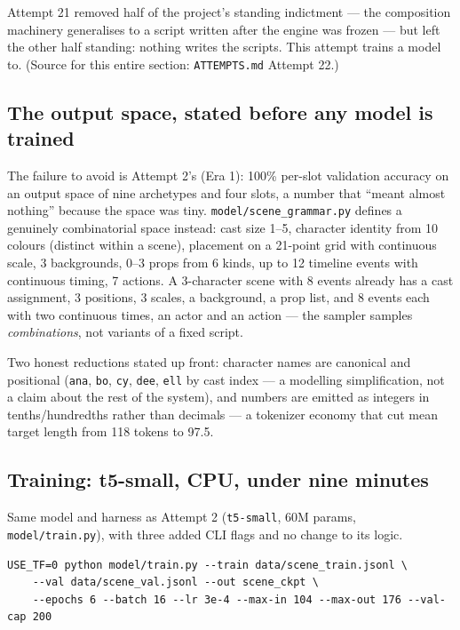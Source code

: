 \documentclass[11pt]{article}
\begin{document}
Attempt 21 removed half of the project's standing indictment --- the
composition machinery generalises to a script written after the engine
was frozen --- but left the other half standing: nothing writes the
scripts. This attempt trains a model to. (Source for this entire section:
\texttt{ATTEMPTS.md} Attempt 22.)

\subsection{The output space, stated before any model is trained}
\label{sec:outputspace}

The failure to avoid is Attempt 2's (Era 1): 100\% per-slot validation
accuracy on an output space of nine archetypes and four slots, a number
that ``meant almost nothing'' because the space was tiny.
\texttt{model/scene\_grammar.py} defines a genuinely combinatorial space
instead: cast size 1--5, character identity from 10 colours (distinct
within a scene), placement on a 21-point grid with continuous scale, 3
backgrounds, 0--3 props from 6 kinds, up to 12 timeline events with
continuous timing, 7 actions. A 3-character scene with 8 events already
has a cast assignment, 3 positions, 3 scales, a background, a prop list,
and 8 events each with two continuous times, an actor and an action ---
the sampler samples \emph{combinations}, not variants of a fixed script.

Two honest reductions stated up front: character names are canonical and
positional (\texttt{ana}, \texttt{bo}, \texttt{cy}, \texttt{dee},
\texttt{ell} by cast index --- a modelling simplification, not a claim
about the rest of the system), and numbers are emitted as integers in
tenths/hundredths rather than decimals --- a tokenizer economy that cut
mean target length from 118 tokens to 97.5.

\subsection{Training: t5-small, CPU, under nine minutes}
\label{sec:training-a22}

Same model and harness as Attempt 2 (\texttt{t5-small}, 60M params,
\texttt{model/train.py}), with three added CLI flags and no change to
its logic.

\begin{verbatim}
USE_TF=0 python model/train.py --train data/scene_train.jsonl \
    --val data/scene_val.jsonl --out scene_ckpt \
    --epochs 6 --batch 16 --lr 3e-4 --max-in 104 --max-out 176 --val-cap 200
\end{verbatim}
\end{document}
